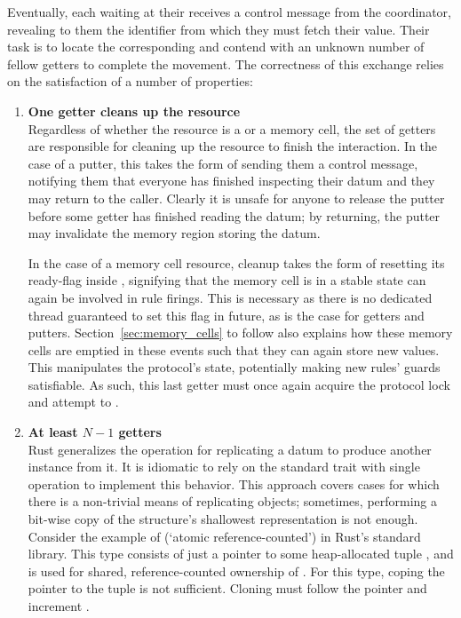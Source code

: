 Eventually, each  waiting at their  receives a control message from the coordinator, revealing to them the identifier from which they must fetch their value. Their task is to locate the corresponding  and contend with an unknown number of fellow getters to complete the movement. The correctness of this exchange relies on the satisfaction of a number of properties:
\begin{enumerate}
	\item \textbf{One getter cleans up the resource}\\
	Regardless of whether the resource is a  or a memory cell, the set of getters are responsible for cleaning up the resource to finish the interaction. In the case of a putter, this takes the form of sending them a control message, notifying them that everyone has finished inspecting their datum and they may return to the caller. Clearly it is unsafe for anyone to release the putter before some getter has finished reading the datum; by returning, the putter may invalidate the memory region storing the datum.
	
	In the case of a memory cell resource, cleanup takes the form of resetting its ready-flag inside , signifying that the memory cell is in a stable state can again be involved in rule firings. This is necessary as there is no dedicated thread guaranteed to set this flag in future, as is the case for getters and putters. Section~\ref{sec:memory_cells} to follow also explains how these memory cells are emptied in these events such that they can again store new values. This manipulates the protocol's state, potentially making new rules' guards satisfiable. As such, this last getter must once again acquire the protocol lock and attempt to .
	
	\item \textbf{At least $N-1$ getters }\\
	Rust generalizes the operation for replicating a datum to produce another instance from it. It is idiomatic to rely on the standard trait  with single operation  to implement this behavior. This approach covers cases for which there is a non-trivial means of replicating objects; sometimes, performing a bit-wise copy of the structure's shallowest representation is not enough. Consider the example of  (`atomic reference-counted') in Rust's standard library. This type consists of just a pointer to some heap-allocated tuple , and is used for shared, reference-counted ownership of . For this type, coping the pointer to the tuple is not sufficient. Cloning must follow the pointer and increment .
	

\end{enumerate}

